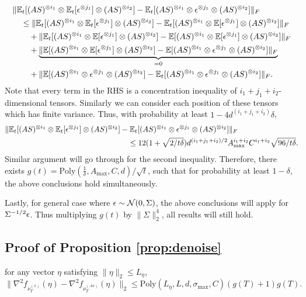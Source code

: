 \begin{align*}
&\|\mathbb{E}_t[(AS)^{\otimes i_1}\otimes \mathbb{E}_t[\epsilon^{\otimes j_1}] \otimes (AS)^{\otimes i_2}] - \mathbb{E}_t[(AS)^{\otimes i_1}\otimes \epsilon^{\otimes j_1}\otimes (AS)^{\otimes i_2}]  \|_F \\
& \quad \le  \|\mathbb{E}_t[(AS)^{\otimes i_1}\otimes \mathbb{E}_t[\epsilon^{\otimes j_1}] \otimes (AS)^{\otimes i_2}] - \mathbb{E}_t[(AS)^{\otimes i_1}\otimes \mathbb{E}[\epsilon^{\otimes j_1}] \otimes (AS)^{\otimes i_2}] \|_F \\
& \quad \quad + \| \mathbb{E}_t[(AS)^{\otimes i_1}\otimes \mathbb{E}[\epsilon^{\otimes j_1}] \otimes (AS)^{\otimes i_2}] - \mathbb{E}[(AS)^{\otimes i_1}\otimes \mathbb{E}[\epsilon^{\otimes j_1}] \otimes (AS)^{\otimes i_2}] \|_F \\
& \quad \quad + \underbrace{\|\mathbb{E}[(AS)^{\otimes i_1}\otimes \mathbb{E}[\epsilon^{\otimes j_1}] \otimes (AS)^{\otimes i_2}]  - \mathbb{E}[(AS)^{\otimes i_1}\otimes \epsilon^{\otimes j_1}\otimes (AS)^{\otimes i_2}] \|_F}_{=0} \\
& \quad \quad + \| \mathbb{E}[(AS)^{\otimes i_1}\otimes \epsilon^{\otimes j_1}\otimes (AS)^{\otimes i_2}] - \mathbb{E}_t[(AS)^{\otimes i_1}\otimes \epsilon^{\otimes j_1}\otimes (AS)^{\otimes i_2}] \|_F.
\end{align*}
Note that every term in the RHS is a concentration inequality of $i_1+j_1+i_2$-dimensional tensors. Similarly we can consider each position of these tensors which has finite variance.
Thus, with probability at least $1- 4d^{(i_1+j_1+i_2)}\delta$,   
\begin{align*}
\|\mathbb{E}_t[(AS)^{\otimes i_1}\otimes \mathbb{E}_t[\epsilon^{\otimes j_1}] \otimes (AS)^{\otimes i_2}] & - \mathbb{E}_t[(AS)^{\otimes i_1}\otimes \epsilon^{\otimes j_1}\otimes (AS)^{\otimes i_2}]  \|_F \\
& \quad \le
12(1+\sqrt{2/t\delta})d^{(i_1+j_1+i_2)/2}A_{\max}^{i_1+i_2}C^{i_1+i_2}\sqrt{96/t\delta}.  
\end{align*}
Similar argument will go through for the second inequality.
Therefore, there exists $g(t) = \text{Poly}(\frac{1}{\delta}, A_{\max}, C, d)/\sqrt{t}$, such that for probability at least $1-\delta$, the above conclusions hold simultaneously.

Lastly, for general case where $\epsilon\sim {\cal{N}}(0,\Sigma)$, the above conclusions will apply for $\Sigma^{-1/2}\epsilon$. Thus multiplying  $g(t)$ by $ \|\Sigma\|^4_2$, all results will still hold. 
\subsection{Proof of Proposition \ref{prop:denoise}} 
\label{subsec:denoise}
for any vector $\eta$ satisfying $\|\eta\|_2\le L_{\eta}$,
\[
\| \nabla^2f_{\nu_T^{(x)}}(\eta) - \nabla^2f_{\nu_T^{(As)}}(\eta) \|_2 \le \text{Poly}(L_{\eta}, L, d, \sigma_{\max}, C)(g(T)+1)g(T). 
\]

